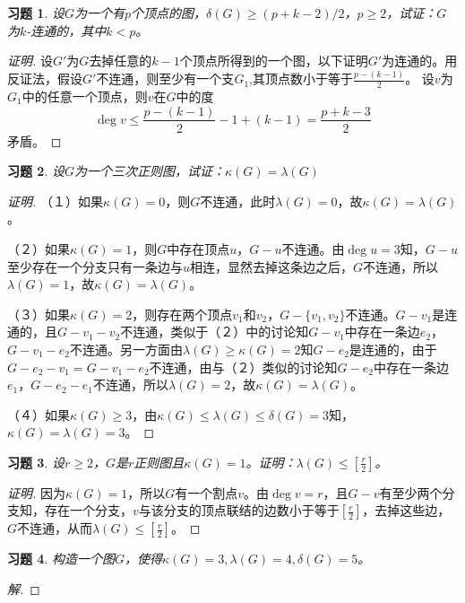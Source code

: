 \documentclass{article}
\begin{document}
\begin{CJK}{UTF8}{gbsn}
\newtheorem{Exercise}{习题}

\begin{Exercise}
  设$G$为一个有$p$个顶点的图，$\delta(G) \geq (p+k-2)/2$，$p\geq 2$，试证：$G$为$k$-连通的，其中$k<p$。
\end{Exercise}
\begin{proof}[证明]
  设$G'$为$G$去掉任意的$k-1$个顶点所得到的一个图，以下证明$G'$为连通的。用反证法，假设$G'$不连通，则至少有一个支$G_1$,其顶点数小于等于$\frac{p-(k-1)}{2}$。
  设$v$为$G_1$中的任意一个顶点，则$v$在$G$中的度
  \[\deg v \leq \frac{p-(k-1)}{2} - 1 + (k-1) = \frac{p+k-3}{2}\]
矛盾。
\end{proof}
\begin{Exercise}
  设$G$为一个三次正则图，试证：$\kappa(G)=\lambda(G)$
\end{Exercise}
\begin{proof}[证明]
  （１）如果$\kappa(G)=0$，则$G$不连通，此时$\lambda(G)=0$，故$\kappa(G) = \lambda(G)$。

（２）如果$\kappa(G)=1$，则$G$中存在顶点$u$，$G-u$不连通。由$\deg u=3$知，$G-u$至少存在一个分支只有一条边与$u$相连，显然去掉这条边之后，$G$不连通，所以$\lambda(G)=1$，故$\kappa(G)=\lambda(G)$。

（３）如果$\kappa(G)=2$，则存在两个顶点$v_1$和$v_2$，$G-\{v_1,v_2\}$不连通。$G-v_1$是连通的，且$G-v_1-v_2$不连通，类似于（２）中的讨论知$G-v_1$中存在一条边$e_2$，$G-v_1-e_2$不连通。另一方面由$\lambda(G)\geq \kappa(G)=2$知$G-e_2$是连通的，由于$G-e_2-v_1=G-v_1-e_2$不连通，由与（２）类似的讨论知$G-e_2$中存在一条边$e_1$，$G-e_2-e_1$不连通，所以$\lambda(G)=2$，故$\kappa(G)=\lambda(G)$。

（４）如果$\kappa(G)\geq 3$，由$\kappa(G) \leq \lambda(G) \leq \delta(G) = 3$知，$\kappa(G)=\lambda(G)=3$。
\end{proof}
\begin{Exercise}
  设$r\geq 2$，$G$是$r$正则图且$\kappa (G)=1$。证明：$\lambda(G) \leq [\frac{r}{2}]$。
\end{Exercise}
\begin{proof}[证明]
  因为$\kappa(G)=1$，所以$G$有一个割点$v$。由$\deg v = r$，且$G-v$有至少两个分支知，存在一个分支，$v$与该分支的顶点联结的边数小于等于$[\frac{r}{2}]$，去掉这些边，$G$不连通，从而$\lambda(G) \leq [\frac{r}{2}]$。
\end{proof}
\begin{Exercise}
  构造一个图$G$，使得$\kappa(G)=3,\lambda(G)=4,\delta(G)=5$。
\end{Exercise}
\begin{proof}[解]
\mbox{} \par \noindent


\end{proof}
\end{CJK}
\end{document}
